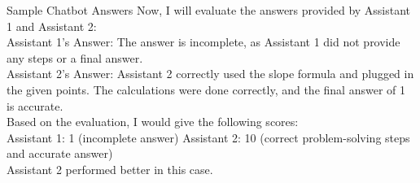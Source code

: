 \begin{AIBox}{Sample Chatbot Answers}
	Now, I will evaluate the answers provided by Assistant 1 and Assistant 2:\\

	Assistant 1's Answer:
	The answer is incomplete, as Assistant 1 did not provide any steps or a final answer.\\

	Assistant 2's Answer:
	Assistant 2 correctly used the slope formula and plugged in the given points. The calculations were done correctly, and the final answer of 1 is accurate.\\

	Based on the evaluation, I would give the following scores:\\

	Assistant 1: 1 (incomplete answer)
	Assistant 2: 10 (correct problem-solving steps and accurate answer)\\

	Assistant 2 performed better in this case.


\end{AIBox}


